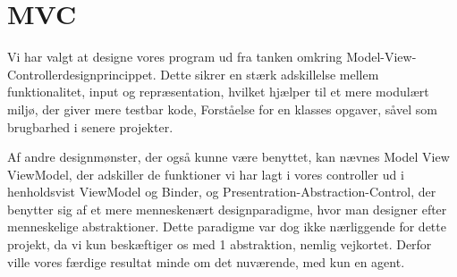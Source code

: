 \section{MVC}
Vi har valgt at designe vores program ud fra tanken omkring Model-View-Controllerdesignprincippet. Dette sikrer en stærk adskillelse mellem funktionalitet, input og repræsentation, hvilket hjælper til et mere modulært miljø, der giver mere testbar kode, Forståelse for en klasses opgaver, såvel som brugbarhed i senere projekter. 

Af andre designmønster, der også kunne være benyttet, kan nævnes Model View ViewModel, der adskiller de funktioner vi har lagt i vores controller ud i henholdsvist ViewModel og Binder, og Presentration-Abstraction-Control, der benytter sig af et mere menneskenært designparadigme, hvor man designer efter menneskelige abstraktioner. Dette paradigme var dog ikke nærliggende for dette projekt, da vi kun beskæftiger os med 1 abstraktion, nemlig vejkortet. Derfor ville vores færdige resultat minde om det nuværende, med kun en agent.